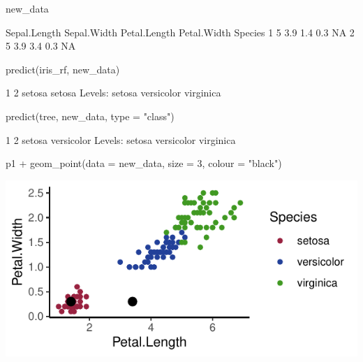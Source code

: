 \documentclass[a4paper]{article}\usepackage[]{graphicx}\usepackage[]{xcolor}
\makeatletter
\def\maxwidth{ %
  \ifdim\Gin@nat@width>\linewidth
    \linewidth
  \else
    \Gin@nat@width
  \fi
}
\makeatother
\begin{document}
\begin{Schunk}
\begin{Sinput}
new_data
\end{Sinput}
\begin{Soutput}
  Sepal.Length Sepal.Width Petal.Length Petal.Width Species
1            5         3.9          1.4         0.3      NA
2            5         3.9          3.4         0.3      NA
\end{Soutput}
\begin{Sinput}
predict(iris_rf, new_data)
\end{Sinput}
\begin{Soutput}
     1      2 
setosa setosa 
Levels: setosa versicolor virginica
\end{Soutput}
\begin{Sinput}
predict(tree, new_data, type = "class")
\end{Sinput}
\begin{Soutput}
         1          2 
    setosa versicolor 
Levels: setosa versicolor virginica
\end{Soutput}
\begin{Sinput}
p1 + geom_point(data = new_data, size = 3, colour = "black")
\end{Sinput}


{\centering \includegraphics[width=\maxwidth]{figure/listings-unnamed-chunk-448-1} 

}

\end{Schunk}
\end{document}
